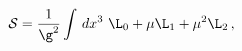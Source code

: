\begin{equation}
{\cal S}=\displaystyle{\frac{1}{\g^{2}} \int\,dx^{3}}~
\L_{0}+\mu\L_{1}+\mu^{2}\L_{2}\,, \label{M2action}
\end{equation}

